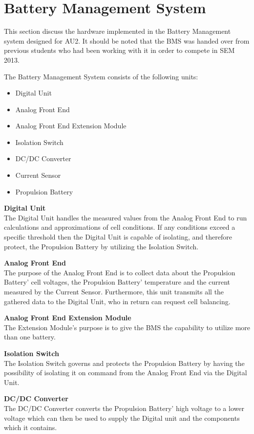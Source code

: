 \section{Battery Management System}
This section discuss the hardware implemented in the Battery Management system designed for AU2. It should be noted that the BMS was handed over from previous students who had been working with it in order to compete in SEM 2013.

The Battery Management System consists of the following units:
\begin{itemize}
	\item{Digital Unit}
	\item{Analog Front End}
	\item{Analog Front End Extension Module}
	\item{Isolation Switch}
	\item{DC/DC Converter}
	\item{Current Sensor}
	\item{Propulsion Battery}
\end{itemize}

\textbf{Digital Unit}\\
The Digital Unit handles the measured values from the Analog Front End to run calculations and approximations of cell conditions. If any conditions exceed a specific threshold then the Digital Unit is capable of isolating, and therefore protect, the Propulsion Battery by utilizing the Isolation Switch.

\textbf{Analog Front End}\\
The purpose of the Analog Front End is to collect data about the Propulsion Battery' cell voltages, the Propulsion Battery' temperature and the current measured by the Current Sensor. Furthermore, this unit transmits all the gathered data to the Digital Unit, who in return can request cell balancing. 

\textbf{Analog Front End Extension Module}\\
The Extension Module's purpose is to give the BMS the capability to utilize more than one battery.

\textbf{Isolation Switch}\\
The Isolation Switch governs and protects the Propulsion Battery by having the possibility of isolating it on command from the Analog Front End via the Digital Unit. 

\textbf{DC/DC Converter}\\
The DC/DC Converter converts the Propulsion Battery' high voltage to a lower voltage which can then be used to supply the Digital unit and the components which it contains.

